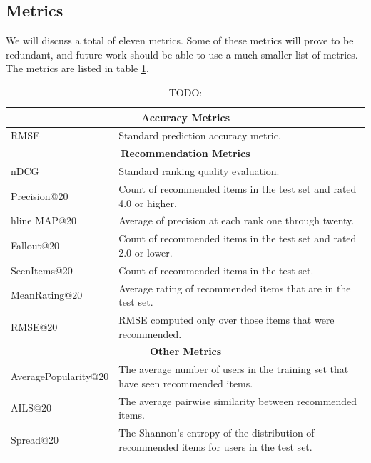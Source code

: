 \documentclass[letterpaper]{sig-alternate}
\begin{document}
  \subsection*{Metrics}
  We will discuss a total of eleven metrics.
  Some of these metrics will prove to be redundant, and future work should be able to use a much smaller list of metrics.
  The metrics are listed in table \ref{tbl:metrics}.
  \begin{table}[ht!]
    \centering
    \begin{tabular}{|p{7em}|p{16em}|}
      \hline
      \multicolumn{2}{|c|}{{\bf Accuracy Metrics}} \\\hline
      RMSE                   & Standard prediction accuracy metric. \\\hline
      \hline
      \multicolumn{2}{|c|}{{\bf Recommendation Metrics}} \\\hline
      nDCG                   & Standard ranking quality evaluation.\\\hline
      Precision@20           & Count of recommended items in the test set and rated 4.0 or higher\footnotemark[1].\\hline
      MAP@20                 & Average of precision at each rank one through twenty.\\\hline
      Fallout@20             & Count of recommended items in the test set and rated 2.0 or lower\footnotemark[1].\\\hline
      SeenItems@20           & Count of recommended items in the test set.\\\hline
      MeanRating@20          & Average rating of recommended items that are in the test set.\\\hline
      RMSE@20                & RMSE computed only over those items that were recommended.\\\hline
      \hline
      \multicolumn{2}{|c|}{{\bf Other Metrics}} \\\hline
      Average\-Popularity@20 & The average number of users in the training set that have seen recommended items.\\\hline
      AILS@20                & The average pairwise similarity between recommended items. \\\hline
      Spread@20              & The Shannon's entropy of the distribution of recommended items for users in the test set.\\\hline
    \end{tabular}
    \caption{TODO:}
    \label{tbl:metrics}
  \end{table}
  
\end{document}
